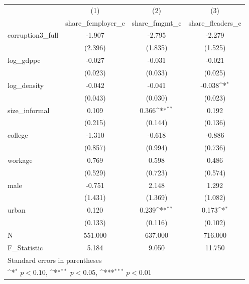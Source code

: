 {
\def\sym#1{\ifmmode^{#1}\else\(^{#1}\)\fi}
\begin{tabular}{l*{3}{c}}
\hline\hline
            &\multicolumn{1}{c}{(1)}&\multicolumn{1}{c}{(2)}&\multicolumn{1}{c}{(3)}\\
            &\multicolumn{1}{c}{share\_femployer\_c}&\multicolumn{1}{c}{share\_fmgmt\_c}&\multicolumn{1}{c}{share\_fleaders\_c}\\
\hline
corruption3\_full&      -1.907         &      -2.795         &      -2.279         \\
            &     (2.396)         &     (1.835)         &     (1.525)         \\
[1em]
log\_gdppc   &      -0.027         &      -0.031         &      -0.021         \\
            &     (0.023)         &     (0.033)         &     (0.025)         \\
[1em]
log\_density &      -0.042         &      -0.041         &      -0.038\sym{*}  \\
            &     (0.043)         &     (0.030)         &     (0.023)         \\
[1em]
size\_informal&       0.109         &       0.366\sym{**} &       0.192         \\
            &     (0.215)         &     (0.144)         &     (0.136)         \\
[1em]
college     &      -1.310         &      -0.618         &      -0.886         \\
            &     (0.857)         &     (0.994)         &     (0.736)         \\
[1em]
workage     &       0.769         &       0.598         &       0.486         \\
            &     (0.529)         &     (0.723)         &     (0.574)         \\
[1em]
male        &      -0.751         &       2.148         &       1.292         \\
            &     (1.431)         &     (1.369)         &     (1.082)         \\
[1em]
urban       &       0.120         &       0.239\sym{**} &       0.173\sym{*}  \\
            &     (0.133)         &     (0.116)         &     (0.102)         \\
\hline
N           &     551.000         &     637.000         &     716.000         \\
F\_Statistic &       5.184         &       9.050         &      11.750         \\
\hline\hline
\multicolumn{4}{l}{\footnotesize Standard errors in parentheses}\\
\multicolumn{4}{l}{\footnotesize \sym{*} \(p<0.10\), \sym{**} \(p<0.05\), \sym{***} \(p<0.01\)}\\
\end{tabular}
}
